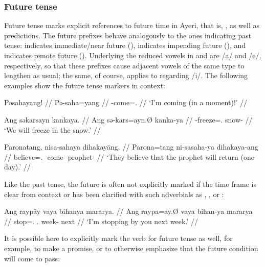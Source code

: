 
\subsubsection{Future tense}
\label{subsubsec:future}

Future tense marks explicit references to future time in Ayeri, that is, 
, as well 
as predictions. The future prefixes behave analogously to the ones indicating 
past tense:  indicates immediate/near future (\NFut{}), 
 indicates impending future (\Fut{}), and  
indicates remote future (\RFut{}). Underlying the reduced vowels in 
 and  are /a/ and /e/, respectively, so that these 
prefixes cause adjacent vowels of the same type to lengthen as 
usual; the same, of course, applies to  
regarding /i/. The following examples show the future tense markers in context:

\pex
\a\label{ex:nfut}\begingl
	\gla Pəsahayang! //
	\glb Pə-saha=yang //
	\glc \NFut{}-come=\Fsg{}.\Aarg{} //
	\glft `I'm coming (in a moment)!' //
\endgl

\a\label{ex:fut}\begingl
	\gla Ang səkarsayn kankaya. //
	\glb Ang sə-kars=ayn.Ø kanka-ya //
	\glc \AgtT{} \Fut{}-freeze=\Fsg{}.\Top{} snow-\Loc{} //
	\glft `We will freeze in the snow.' //
\endgl

\a\label{ex:rfut}\begingl
	\gla Paronatang, nisa-sahaya dihakayāng. //
	\glb Parona=tang ni-sa\til{}saha-ya dihakaya-ang //
	\glc believe=\TplM{}.\Aarg{} \RFut{}-\Iter{}\til{}come-\TsgM{} 
		prophet-\Aarg{} //
	\glft `They believe that the prophet will return (one day).' //
\endgl

\xe

Like the past tense, the future is often not explicitly marked if the time 
frame is clear from context or has been clarified with such adverbials as 
, , or :

\ex\begingl
	\gla Ang raypāy vaya bihanya mararya. //
	\glb Ang raypa=ay.Ø vaya bihan-ya mararya //
	\glc \AgtT{} stop=\Fsg{}.\Top{} \Ssg{}.\Loc{} week-\Loc{} next //
	\glft `I'm stopping by you next week.' //
\endgl\xe

It is possible here to explicitly mark the verb for future tense as well, for 
example, to make a promise, or to otherwise emphasize that the future condition 
will come to pass:

